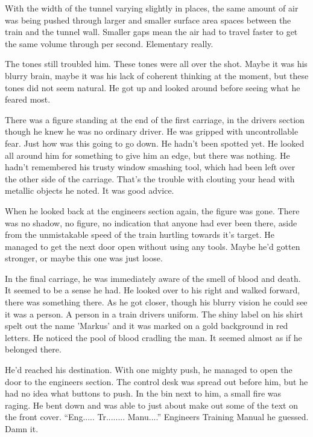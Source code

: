With the width of the tunnel varying slightly in places, the same amount of air was being pushed through larger and smaller surface area spaces between the train and the tunnel wall.  Smaller gaps mean the air had to travel faster to get the same volume through per second.  Elementary really.  

The tones still troubled him.  These tones were all over the shot.  Maybe it was his blurry brain, maybe it was his lack of coherent thinking at the moment, but these tones did not seem natural.  He got up and looked around before seeing what he feared most.

There was a figure standing at the end of the first carriage, in the drivers section though he knew he was no ordinary driver.  He was gripped with uncontrollable fear.  Just how was this going to go down.  He hadn't been spotted yet.  He looked all around him for something to give him an edge, but there was nothing.  He hadn't remembered his trusty window smashing tool, which had been left over the other side of the carriage.  That's the trouble with clouting your head with metallic objects he noted.  It was good advice.

When he looked back at the engineers section again, the figure was gone.  There was no shadow, no figure, no indication that anyone had ever been there, aside from the unmistakable speed of the train hurtling towards it's target.  He managed to get the next door open without using any tools.  Maybe he'd gotten stronger, or maybe this one was just loose.

In the final carriage, he was immediately aware of the smell of blood and death.  It seemed to be a sense he had.  He looked over to his right and walked forward, there was something there.  As he got closer, though his blurry vision he could see it was a person.  A person in a train drivers uniform.  The shiny label on his shirt spelt out the name 'Markus' and it was marked on a gold background in red letters.  He noticed the pool of blood cradling the man.  It seemed almost as if he belonged there.  

He'd reached his destination.  With one mighty push, he managed to open the door to the engineers section.  The control desk was spread out before him, but he had no idea what buttons to push.  In the bin next to him, a small fire was raging.  He bent down and was able to just about make out some of the text on the front cover.  ``Eng..... Tr........ Manu....''  Engineers Training Manual he guessed.  Damn it.  

